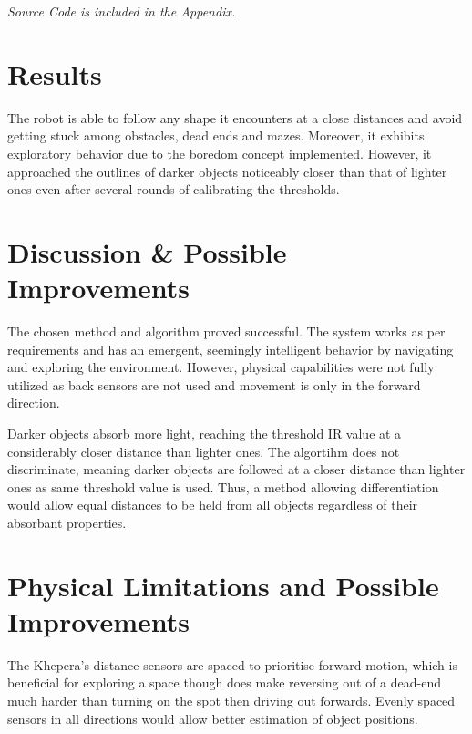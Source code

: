 \documentclass[11pt, a4paper]{article}
\begin{document}
\begin{center}
  \emph{Source Code is included in the Appendix.}
\end{center}




\newpage
\section{Results}

The robot is able to follow any shape it encounters at a close distances and 
avoid getting stuck among obstacles, dead ends and mazes. Moreover, it exhibits 
exploratory behavior due to the boredom concept implemented. However, it approached
the outlines of darker objects noticeably closer than that of lighter ones 
even after several rounds of calibrating the thresholds.


\section{Discussion \& Possible Improvements}

The chosen method and algorithm proved successful. The system works as
per requirements and has an emergent, seemingly intelligent behavior by navigating and 
exploring the environment. However, physical capabilities were not fully utilized
as back sensors are not used and movement is only in the forward direction. 


Darker objects absorb more light, reaching the threshold IR value at a considerably closer 
distance than lighter ones. The algortihm does not discriminate, meaning darker objects are 
followed at a closer distance than lighter ones as same threshold value is used. Thus, a 
method allowing differentiation would allow equal distances to be held from all objects 
regardless of their absorbant properties. 


\section{Physical Limitations and Possible Improvements}

The Khepera's distance sensors are spaced to prioritise forward motion, which is beneficial 
for exploring a space though does make reversing out of a dead-end much harder than 
turning on the spot then driving out forwards. Evenly spaced sensors in all directions would 
allow better estimation of object positions.
\end{document}
